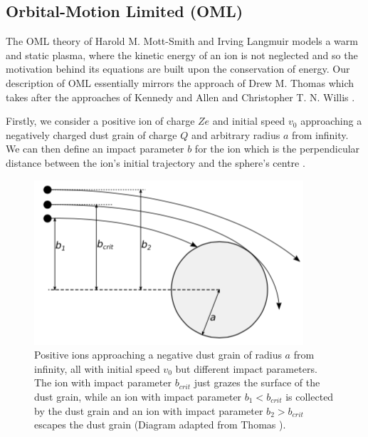 \documentclass[journal]{Imperial_lab_report}
\begin{document}
\subsection{Orbital-Motion Limited (OML)}

The OML theory of Harold M. Mott-Smith and Irving Langmuir \cite{OriginalOML} models a warm and static plasma, where the kinetic energy of an ion is not neglected and so the motivation behind its equations are built upon the conservation of energy. Our description of OML essentially mirrors the approach of Drew M. Thomas \cite{Thomas} which takes after the approaches of Kennedy and Allen \cite{OML} and Christopher T. N. Willis \cite{Willis}\cite{SandM}.

\smallskip

Firstly, we consider a positive ion of charge $Ze$ and initial speed $v_{0}$ approaching a negatively charged dust grain of charge $Q$ and arbitrary radius $a$ from infinity. We can then define an impact parameter $b$ for the ion which is the perpendicular distance between the ion's initial trajectory and the sphere's centre \cite{Thomas}.

\begin{figure}[H]
\centering
\includegraphics[width=\linewidth]{Output/Impactparameter.jpeg}
\caption{Positive ions approaching a negative dust grain of radius $a$ from infinity, all with initial speed $v_{0}$ but different impact parameters. The ion with impact parameter $b_{crit}$ just grazes the surface of the dust grain, while an ion with impact parameter $b_{1} < b_{crit}$ is collected by the dust grain and an ion with impact parameter $b_{2} > b_{crit}$ escapes the dust grain (Diagram adapted from Thomas \cite{Thomas}).}
\label{OMLtrejectories} 
\end{figure}
\end{document}
